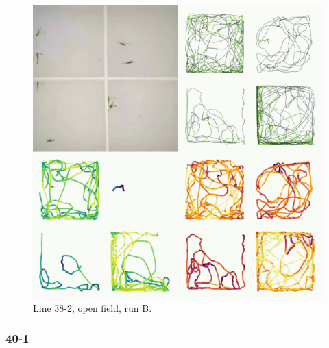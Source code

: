 \documentclass[
]{book}
\begin{document}
\begin{figure}
\includegraphics[width=1\linewidth]{figs/mikk_behaviour/four_panel_plots/open_field_20191116_1309_21-2_R_B_300} \caption{Line 38-2, open field, run B.}\label{fig:4p-21-2-of-B}
\end{figure}

\hypertarget{section-5}{%
\subsubsection{40-1}\label{section-5}}
\end{document}
